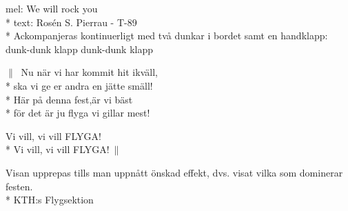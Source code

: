 \begin{SongText}
    \begin{SongInfo}
        mel: We will rock you\\*%
        text: Rosén S. Pierrau - T-89\\*%
        Ackompanjeras kontinuerligt med två dunkar i bordet samt en handklapp: dunk-dunk klapp dunk-dunk klapp
    \end{SongInfo}
    \begin{SongVerse}
        $\|\:$ Nu när vi har kommit hit ikväll,\\*%
        ska vi ge er andra en jätte smäll!\\*%
        Här på denna fest,är vi bäst\\*%
        för det är ju flyga vi gillar mest! 
    \end{SongVerse}
    \begin{SongVerse}
        Vi vill, vi vill FLYGA!\\*%
        Vi vill, vi vill FLYGA!$\:\|$
    \end{SongVerse}
    \begin{SongInfo}
        Visan upprepas tills man uppnått önskad effekt, dvs. visat vilka som dominerar festen.\\*%
        KTH:s Flygsektion
    \end{SongInfo}
\end{SongText}
